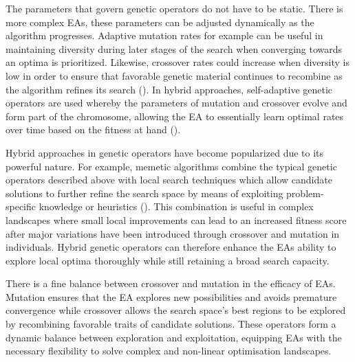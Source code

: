 \noindent The parameters that govern genetic operators do not have to be static. There is more complex EAs, these parameters can be adjusted dynamically as the algorithm progresses. Adaptive mutation rates for example can be useful in maintaining diversity during later stages of the search when converging towards an optima is prioritized. Likewise, crossover rates could increase when diversity is low in order to ensure that favorable genetic material continues to recombine as the algorithm refines its search (\cite{meyer2007self}). In hybrid approaches, self-adaptive genetic operators are used whereby the parameters of mutation and crossover evolve and form part of the chromosome, allowing the EA to essentially learn optimal rates over time based on the fitness at hand (\cite{meyer2007self}). \bigskip

\noindent Hybrid approaches in genetic operators have become popularized due to its powerful nature. For example, memetic algorithms combine the typical genetic operators described above with local search techniques which allow candidate solutions to further refine the search space by means of exploiting problem-specific knowledge or heuristics (\cite{neri2012memetic}). This combination is useful in complex landscapes where small local improvements can lead to an increased fitness score after major variations have been introduced through crossover and mutation in individuals. Hybrid genetic operators can therefore enhance the EAs ability to explore local optima thoroughly while still retaining a broad search capacity. \bigskip

\noindent There is a fine balance between crossover and mutation in the efficacy of EAs. Mutation ensures that the EA explores new possibilities and avoids premature convergence while crossover allows the search space's best regions to be explored by recombining favorable traits of candidate solutions. These operators form a dynamic balance between exploration and exploitation, equipping EAs with the necessary flexibility to solve complex and non-linear optimisation landscapes.

